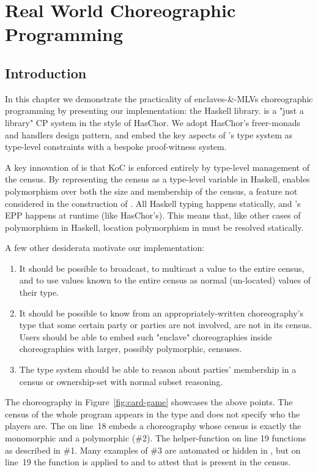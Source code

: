 \chapter{Real World Choreographic Programming}
\label{sec:multichor}


\section{Introduction}
In this chapter we demonstrate the practicality of enclaves-\&-MLVs choreographic programming
by presenting our implementation:
the \MultiChor Haskell library.
\MultiChor is a "just a library" CP system in the style of HasChor.
We adopt HasChor's freer-monads and handlers design pattern,
and embed the key aspects of \HLSCentral's type system as type-level constraints with a bespoke proof-witness system.

A key innovation of \HLSCentral is that KoC is enforced entirely
by type-level management of the census.
By representing the census as a type-level variable in Haskell,
\MultiChor enables polymorphism over both the size and membership of the census,
a feature not considered in the construction of \HLSCentral.
All Haskell typing happens statically, and \MultiChor's EPP happens at runtime (like HasChor's).
This means that, like other cases of polymorphism in Haskell, location polymorphism in \MultiChor must be resolved statically.

A few other desiderata motivate our implementation:
\begin{enumerate}
    \item It should be possible to broadcast, \ie to multicast a value to the entire census,
          and to use values known to the entire census as normal (un-located) values of their type.
    \item It should be possible to know from an appropriately-written choreography's type that some
          certain party or parties are not involved, are not in its census.
          Users should be able to embed such "enclave" choreographies inside choreographies with larger,
          possibly polymorphic, censuses.
    \item The type system should be able to reason about parties'
          membership in a census or ownership-set
          with normal subset reasoning.
\end{enumerate}
The choreography in Figure~\ref{fig:card-game} showcases the above points.
The census of the whole program appears in the type
and does not specify who the players are.
The  on line~18
embeds a choreography whose census is exactly the monomorphic 
and a polymorphic  (\#2).
The helper-function  on line 19 functions as described in \#1.
Many examples of \#3 are automated or hidden in \MultiChor,
but on line~19 the function  is applied to
and 
to attest that  is present in the census.

